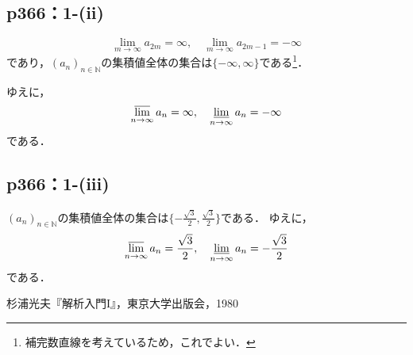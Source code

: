 \documentclass[uplatex,dvipdfmx,a4paper,10pt,fleqn]{jsarticle}
\begin{document}
\subsection*{p366：1-(ii)}

\begin{tleftbar}
    \[
        \lim_{m \to \infty} a_{2m} = \infty , \quad \lim_{m \to \infty} a_{2m-1} = -\infty
    \]
    であり，$(a_n)_{n \in \mathbb{N}}$の集積値全体の集合は$\{ -\infty , \infty \}$である\footnote{補完数直線を考えているため，これでよい．}．

    ゆえに，
    \[
        \varlimsup_{n \to \infty} a_n = \infty , \quad \varliminf_{n \to \infty} a_n =-\infty 
    \]
    である．
\end{tleftbar}

\subsection*{p366：1-(iii)}

\begin{tleftbar}
    $(a_n)_{n \in \mathbb{N}}$の集積値全体の集合は$\{ -\frac{\sqrt{3}}{2} , \frac{\sqrt{3}}{2} \}$である．
    ゆえに，
    \[
        \varlimsup_{n \to \infty} a_n = \frac{\sqrt{3}}{2} , \quad \varliminf_{n \to \infty} a_n =-\frac{\sqrt{3}}{2}
    \]
    である．
\end{tleftbar}



\begin{thebibliography}{9}
	 杉浦光夫『解析入門I』，東京大学出版会，1980
\end{thebibliography}
\end{document}
